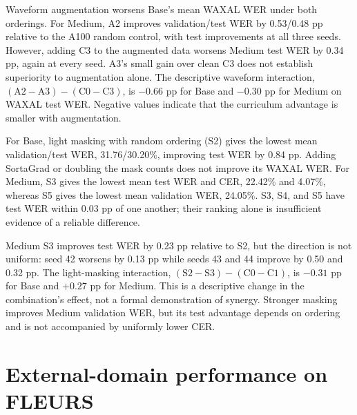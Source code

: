 \documentclass[12pt,a4paper]{report}
\begin{document}
Waveform augmentation worsens Base's mean WAXAL WER under both orderings.
For Medium, A2 improves validation/test WER by 0.53/0.48 pp relative to
the A100 random control, with test improvements at all three seeds. However,
adding C3 to the augmented data worsens Medium test WER by 0.34 pp, again
at every seed. A3's small gain over clean C3 does not establish superiority
to augmentation alone. The descriptive waveform interaction,
$(\mathrm{A2}-\mathrm{A3})-(\mathrm{C0}-\mathrm{C3})$, is $-0.66$ pp for
Base and $-0.30$ pp for Medium on WAXAL test WER. Negative values indicate
that the curriculum advantage is smaller with augmentation.

For Base, light masking with random ordering (S2) gives the lowest mean
validation/test WER, 31.76/30.20\%, improving test WER by 0.84 pp.
Adding SortaGrad or doubling the mask counts does not improve its WAXAL
WER. For Medium, S3 gives the lowest mean test WER and CER, 22.42\% and
4.07\%, whereas S5 gives the lowest mean validation WER, 24.05\%.
S3, S4, and S5 have test WER within 0.03 pp of one another; their ranking
alone is insufficient evidence of a reliable difference.

Medium S3 improves test WER by 0.23 pp relative to S2, but the direction
is not uniform: seed 42 worsens by 0.13 pp while seeds 43 and 44 improve
by 0.50 and 0.32 pp. The light-masking interaction,
$(\mathrm{S2}-\mathrm{S3})-(\mathrm{C0}-\mathrm{C1})$, is $-0.31$ pp
for Base and $+0.27$ pp for Medium. This is a descriptive change in the
combination's effect, not a formal demonstration of synergy. Stronger
masking improves Medium validation WER, but its test advantage depends on
ordering and is not accompanied by uniformly lower CER.

\section{External-domain performance on FLEURS}
\label{sec:fleurs}
\end{document}
